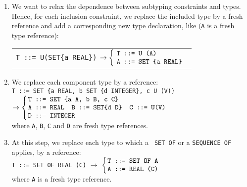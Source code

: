\begin{enumerate}
  \item \label{contained_reference}
        We want to relax the dependence between
        subtyping constraints and types. Hence, for each inclusion
        constraint, we replace the included type by 
        a fresh reference and add a corresponding new type
        declaration, like (\texttt{\small A} is a fresh type
        reference):\\
        {\small
         \begin{tabular}{l}
           \verb+T ::= U(SET{a REAL})+
           $\rightarrow
           \left\{\hspace*{-2pt}
                \begin{tabular}{l}
                   \verb+T ::= U (A)+ \\
                   \verb+A ::= SET {a REAL}+
                \end{tabular}
              \right.$
         \end{tabular}}

  \item \label{component_types}
        We replace each component type by a reference:\\
        {\small
         \verb+T ::= SET {a REAL, b SET {d INTEGER}, c U (V)}+\\
         $\rightarrow
          \left\{\hspace*{-5pt}
            \begin{tabular}{l}
               \verb+T ::= SET {a A, b B, c C}+\\
               \verb+A ::= REAL  B ::= SET{d D}  C ::= U(V)+\\
               \verb+D ::= INTEGER+
            \end{tabular}
          \right.$}\\
        where \texttt{\small A}, \texttt{\small B}, \texttt{\small C}
        and \texttt{\small D} are fresh type references.

  \item \label{types_in_SETOF}
        At this step, we replace each type to which a \texttt{\small
        SET OF} or a \texttt{\small SEQUENCE OF} applies, by a
        reference:\\
        {\small
            \verb+T ::= SET OF REAL (C)+
            $\longrightarrow$
            $\left\{\hspace*{-5pt}
               \begin{tabular}{l}    
                  \verb+T ::= SET OF A+\\
                  \verb+A ::= REAL (C)+
               \end{tabular}
             \right.$}\\
        where \texttt{\small A} is a fresh type reference.


\end{enumerate}
